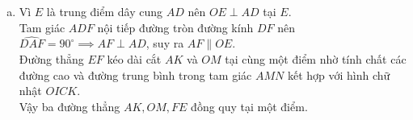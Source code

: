 \begin{bt}
{\begin{enumerate}[a)]
	Do đó $\widehat{NDK} = \widehat{NOA}$.
	\item Vì $E$ là trung điểm dây cung $AD$ nên $OE \perp AD$ tại $E$.\\
	Tam giác $ADF$ nội tiếp đường tròn đường kính $DF$ nên $\widehat{DAF} = 90^\circ \implies AF \perp AD$, suy ra $AF \parallel OE$.\\
	Đường thẳng $EF$ kéo dài cắt $AK$ và $OM$ tại cùng một điểm nhờ tính chất các đường cao và đường trung bình trong tam giác $AMN$ kết hợp với hình chữ nhật $OICK$.\\
	Vậy ba đường thẳng $AK, OM, FE$ đồng quy tại một điểm.
\end{enumerate}
}
\end{bt}
